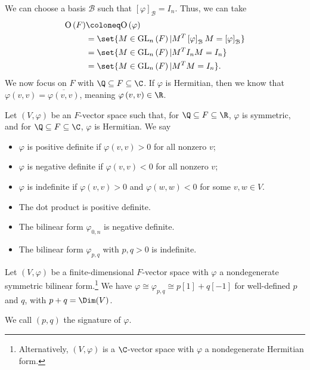 \documentclass[10pt]{mypackage}
\begin{document}
  We can choose a basis $\mathcal{B}$ such that $\left[\varphi\right]_{\mathcal{B}} = I_n$. Thus, we can take
  \begin{align*}
    \text{O}\left(F\right) &\coloneq \text{O}\left(\varphi\right)\\
                           &= \set{M\in \text{GL}_n\left(F\right)|M^{T}\left[\varphi\right]_{\mathcal{B}}M = \left[\varphi\right]_{\mathcal{B}}}\\
                           &= \set{M\in \text{GL}_{n}\left(F\right) | M^{T}I_n M = I_n}\\
                           &= \set{M\in \text{GL}_{n}\left(F\right) | M^{T}M = I_n}.
  \end{align*}
  We now focus on $F$ with $\Q\subseteq F \subseteq \C$. If $\varphi$ is Hermitian, then we know that $\varphi\left(v,v\right) = \overline{\varphi\left(v,v\right)}$, meaning $\varphi\left(v,v\right) \in \R$.
  \begin{definition}[]
    Let $\left(V,\varphi\right)$ be an $F$-vector space such that, for $\Q\subseteq F \subseteq \R$, $\varphi$ is symmetric, and for $\Q\subseteq F\subseteq \C$, $\varphi$ is Hermitian. We say 
    \begin{itemize}
      \item $\varphi$ is positive definite if $\varphi\left(v,v\right) > 0$ for all nonzero $v$;
      \item $\varphi$ is negative definite if $\varphi\left(v,v\right) < 0$ for all nonzero $v$;
      \item $\varphi$ is indefinite if $\varphi\left(v,v\right) > 0$ and $\varphi\left(w,w\right) < 0$ for some $v,w\in V$.
    \end{itemize}
  \end{definition}
  \begin{example}\hfill
    \begin{itemize}
      \item The dot product is positive definite.
      \item The bilinear form $\varphi_{0,n}$ is negative definite.
      \item The bilinear form $\varphi_{p,q}$ with $p,q > 0$ is indefinite.
    \end{itemize}
  \end{example}
  \begin{theorem}
    Let $\left(V,\varphi\right)$ be a finite-dimensional $F$-vector space with $\varphi$ a nondegenerate symmetric bilinear form.\footnote{Alternatively, $\left(V,\varphi\right)$ is a $\C$-vector space with $\varphi$ a nondegenerate Hermitian form.} We have $\varphi \cong \varphi_{p,q} \cong p[1] + q[-1]$ for well-defined $p$ and $q$, with $p + q = \Dim(V)$.\newline

    We call $\left(p,q\right)$ the signature of $\varphi$.
  \end{theorem}
\end{document}

